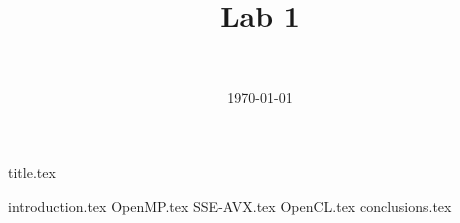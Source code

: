 \documentclass[final]{report} %
\title{Lab 1}
\author{~}
\date{\today}
\begin{document}

{title.tex}
\newpage
\tableofcontents

\newpage
{}
{introduction.tex}
{OpenMP.tex}
{SSE-AVX.tex}
{OpenCL.tex}
{conclusions.tex}
\newpage
{}

\printbibliography
\end{document}
